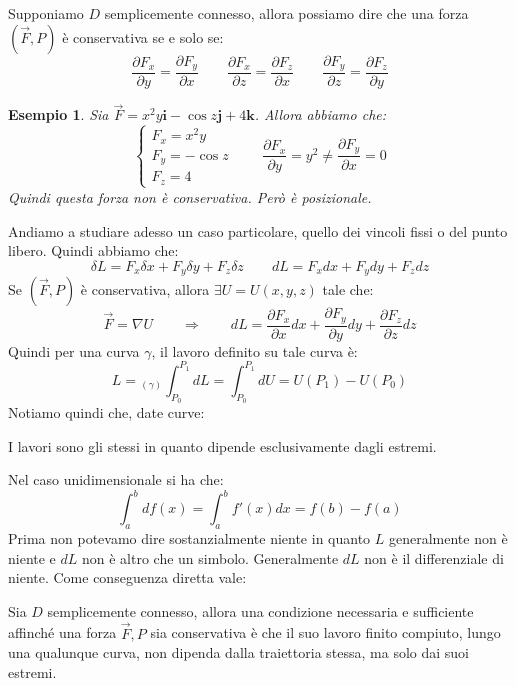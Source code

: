 \documentclass[11pt,a4paper,twoside]{article}
\newtheorem{es}{Esempio}
\theoremstyle{definition}
\begin{document}
Supponiamo $D$ semplicemente connesso, allora possiamo dire che una forza $(\vec F, P)$ è conservativa se e solo se:
\[ \frac{\partial F_x}{\partial y} = \frac{\partial F_y}{\partial x}\qquad \frac{\partial F_x}{\partial z} = \frac{\partial F_z}{\partial x}\qquad \frac{\partial F_y}{\partial z} = \frac{\partial F_z}{\partial y} \]

\begin{es}
	Sia $\vec F = x^2 y \mathbf i - \cos z \mathbf j + 4 \mathbf k$. Allora abbiamo che:
	\[ \begin{cases}
		F_x = x^2y\\
		F_y = -\cos z\\
		F_z = 4
	\end{cases} \qquad \frac{\partial F_x}{\partial y} = y^2 \neq \frac{\partial F_y}{\partial x} = 0\]
	Quindi questa forza non è conservativa. Però è posizionale.
\end{es}

Andiamo a studiare adesso un caso particolare, quello dei vincoli fissi o del punto libero. Quindi abbiamo che:
\[ \delta L = F_x \delta x + F_y \delta y + F_z \delta z\qquad dL = F_xdx + F_ydy + F_zdz \]
Se $(\vec F, P)$ è conservativa, allora $\exists U = U(x,y,z)$ tale che:
\[ \vec F = \nabla U \qquad \Rightarrow \qquad dL = \frac{\partial F_x}{\partial x}dx + \frac{\partial F_y}{\partial y}dy + \frac{\partial F_z}{\partial z}dz \]
Quindi per una curva $\gamma$, il lavoro definito su tale curva è:
\[ L = \left._{(\gamma)} \int_{P_0}^{P_1} \right. dL = \int_{P_0}^{P_1}dU = U(P_1) - U(P_0) \]
Notiamo quindi che, date curve:
\begin{center}
\end{center}
I lavori sono gli stessi in quanto dipende esclusivamente dagli estremi.

Nel caso unidimensionale si ha che:
\[ \int_a^b df(x) = \int_a^b f'(x)dx = f(b) - f(a)\]
Prima non potevamo dire sostanzialmente niente in quanto $L$ generalmente non è niente e $dL$ non è altro che un simbolo. Generalmente $dL$ non è il differenziale di niente. Come conseguenza diretta vale:
\begin{prop}{}{}
	Sia $D$ semplicemente connesso, allora una condizione necessaria e sufficiente affinché una forza $\vec F, P$ sia conservativa è che il suo lavoro finito compiuto, lungo una qualunque curva, non dipenda dalla traiettoria stessa, ma solo dai suoi estremi.
\end{prop}
\end{document}
